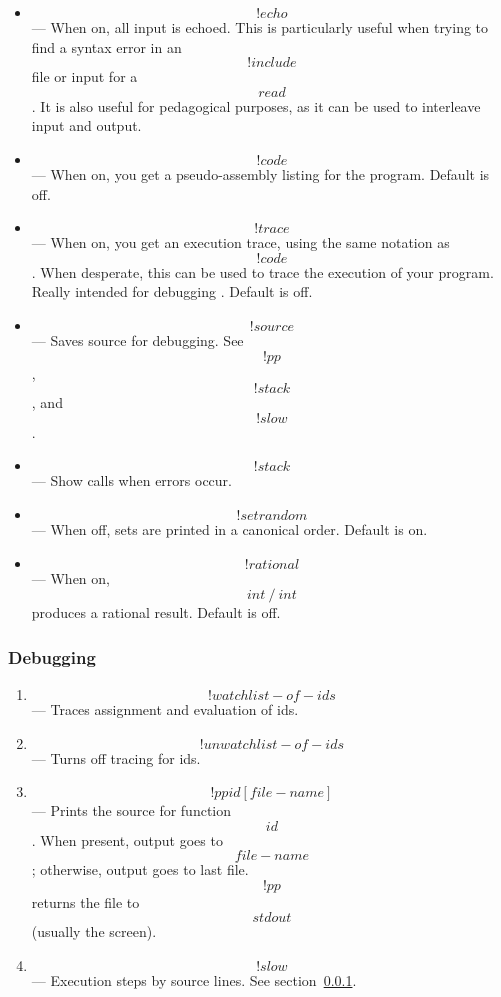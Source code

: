 {\begin{itemize}
\item
{}
\[!echo\] --- When on, all input is echoed.
This is particularly useful when trying to find a syntax error in an
\[!include\] file or input for a \[read\].
It is also useful for pedagogical purposes, as it can be used to 
interleave input and output.


\item{}
\[!code\] --- When on, you get a pseudo-assembly listing
for the program.  Default is off.

\item{}
\[!trace\] --- When on, you get an execution trace, using
the same notation as \[!code\].
When desperate, this can be used to trace the execution of your
program.
Really intended for debugging \ISETL{}\@.
Default is off.

\item{}
\[!source\] --- Saves source for debugging.  See \[!pp\], \[!stack\],
and \[!slow\].


\item{}
\[!stack\] --- Show calls when errors occur.

\item{}
\[!setrandom\] --- When off, sets are printed in a canonical order.
Default is on.

\item{}
\[!rational\] --- When on, \[int~/~int\] produces a rational result.
Default is off.

\end{itemize}

\subsubsection{Debugging}
\label{debugger}
\begin{enumerate}
\item{}
\[!watch list-of-ids\] --- Traces assignment and evaluation of ids.

\item{}
\[!unwatch list-of-ids\] --- Turns off tracing for ids.

\item{}
\[!pp id [ file-name ]\] --- Prints the source for function \[id\].
When present, output goes to \[file-name\]; otherwise, output goes to
last file.  \[!pp\] returns the file to \[stdout\] (usually the screen).


\item{}
\[!slow\] --- Execution steps by source lines.  See section~\ref{debugger}.



\end{enumerate}}
